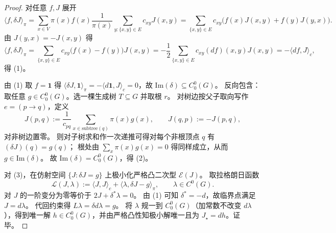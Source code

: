 \begin{proof}
对任意 \(f,J\) 展开
\[
\langle f,\delta J\rangle_\pi
=\sum_{x\in V}\pi(x)f(x)\frac{1}{\pi(x)}\sum_{y:\{x,y\}\in E}c_{xy}J(x,y)
=\sum_{\{x,y\}\in E}c_{xy}\bigl(f(x)J(x,y)+f(y)J(y,x)\bigr).
\]
由 \(J(y,x)=-J(x,y)\) 得
\[
\langle f,\delta J\rangle_\pi
=\sum_{\{x,y\}\in E}c_{xy}\bigl(f(x)-f(y)\bigr)J(x,y)
=-\frac12\sum_{\{x,y\}\in E}c_{xy}(df)(x,y)J(x,y)
=-\langle df,J\rangle_c,
\]
得 (1)。
\par
由 (1) 取 \(f=\mathbf 1\) 得 \(\langle \delta J,\mathbf 1\rangle_\pi=-\langle d\mathbf 1,J\rangle_c=0\)，故 \(\mathrm{Im}(\delta)\subseteq C^0_0(G)\)。
反向包含：取任意 \(g\in C^0_0(G)\)。选一棵生成树 \(T\subseteq G\) 并取根 \(r\)。
对树边按父子取向写作 \(e=(p\to q)\)，定义
\[
J(p,q):=\frac{1}{c_{pq}}\sum_{x\in \mathrm{subtree}(q)}\pi(x)g(x),
\qquad
J(q,p):=-J(p,q),
\]
对非树边置零。
则对子树求和作一次递推可得对每个非根顶点 \(q\) 有 \((\delta J)(q)=g(q)\)；
根处由 \(\sum_x\pi(x)g(x)=0\) 得同样成立，从而 \(g\in\mathrm{Im}(\delta)\)。
故 \(\mathrm{Im}(\delta)=C^0_0(G)\)，得 (2)。
\par
对 (3)，在仿射空间 \(\{J:\delta J=g\}\) 上极小化严格凸二次型 \(\mathcal E(J)\)。
取拉格朗日函数
\[
\mathcal L(J,\lambda):=\langle J,J\rangle_c+\langle \lambda,\delta J-g\rangle_\pi,
\qquad \lambda\in C^0(G).
\]
对 \(J\) 的一阶变分为零等价于
\(
2J+\delta^\ast\lambda=0
\)。
由 (1) 可知 \(\delta^\ast=-d\)，故临界点满足 \(J=d\lambda\)。
代回约束得 \(L\lambda=\delta d\lambda=g\)。
将 \(\lambda\) 规一到 \(C^0_0(G)\)（加常数不改变 \(d\lambda\)），得到唯一解 \(h\in C^0_0(G)\)，并由严格凸性知极小解唯一且为 \(J_\star=dh\)。证毕。
\end{proof}

